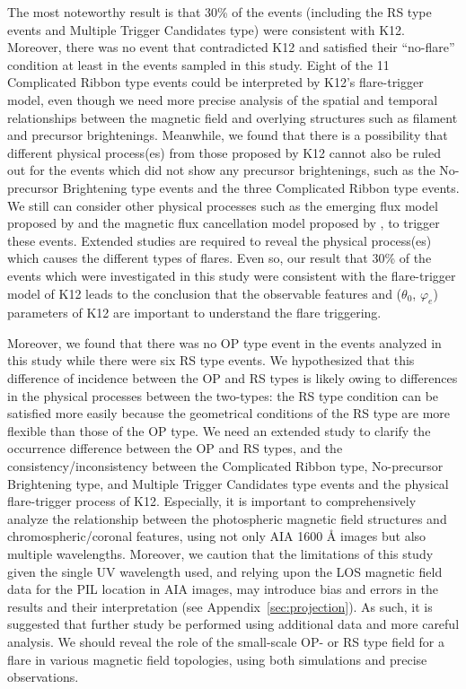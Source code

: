 \documentclass[10pt,preprint2]{aastex}
\begin{document}
The most noteworthy result is that 30\% of the events (including the RS type events and Multiple Trigger Candidates type) were consistent with K12.
Moreover, there was no event that contradicted K12 and satisfied their ``no-flare'' condition at least in the events sampled in this study.
Eight of the 11 Complicated Ribbon type events could be interpreted by K12's flare-trigger model, even though we need more precise analysis of the spatial and temporal relationships between the magnetic field and overlying structures such as filament and precursor brightenings.
Meanwhile, we found that there is a possibility that different physical process(es) from those proposed by K12 cannot also be ruled out for the events which did not show any precursor brightenings, such as the No-precursor Brightening type events and the three Complicated Ribbon type events.
We still can consider other physical processes such as the emerging flux model proposed by \citet{chenshibata00} and the magnetic flux cancellation model proposed by \citet{vanBallegooijen89, Zhang01, Green11}, to trigger these events.
Extended studies are required to reveal the physical process(es) which causes the different types of flares.
Even so, our result that 30\% of the events which were investigated in this study were consistent with the flare-trigger model of K12 leads to the conclusion that the observable features and ($\theta_{0}$, $\varphi_{e}$) parameters of K12 are important to understand the flare triggering.

Moreover, we found that there was no OP type event in the events analyzed in this study while there were six RS type events.
We hypothesized that this difference of incidence between the OP and RS types is likely owing to differences in the physical processes between the two-types: the RS type condition can be satisfied more easily because the geometrical conditions of the RS type are more flexible than those of the OP type.
We need an extended study to clarify the occurrence difference between the OP and RS types, and the consistency/inconsistency between the Complicated Ribbon type, No-precursor Brightening type, and Multiple Trigger Candidates type events and the physical flare-trigger process of K12.
Especially, it is important to comprehensively analyze the relationship between the photospheric magnetic field structures and chromospheric/coronal features, using not only AIA 1600 {\AA} images but also multiple wavelengths.
Moreover, we caution that the limitations of this study given the single UV wavelength used, and relying upon the LOS magnetic field data for the PIL location in AIA images, may introduce bias and errors in the results and their interpretation (see Appendix~\ref{sec:projection}).
As such, it is suggested that further study be performed using additional data and more careful analysis. 
We should reveal the role of the small-scale OP- or RS type field for a flare in various magnetic field topologies, using both simulations and precise observations.
\end{document}
